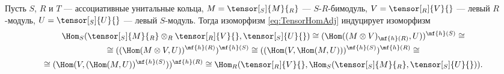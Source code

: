 \documentclass[
	extrafontsizes,
	11pt,
	hyphens,
]{memoir}
\begin{document}

\begin{observation}
Пусть \(S\), \(R\) и \(T\) --- ассоциативные унитальные кольца, \(M = \tensor[_S]{M}{_R}\) --- \(S\)-\(R\)-би\-мо\-дуль, \(V = \tensor[_R]{V}{}\) --- левый \(R\)-мо\-дуль, \(U = \tensor[_S]{U}{}\) --- левый \(S\)-мо\-дуль.
Тогда изоморфизм \eqref{eq:TensorHomAdj}
индуцирует изоморфизм
\begin{gather*}
\Hom_{S} (\tensor[_S]{M}{_R} \otimes_R \tensor[_R]{V}{}, \tensor[_S]{U}{})
\cong
(\Hom((M \otimes V)_{\mf{h}(R)}, U))^{\mf{h}(S)}
\cong
\\
\cong
((\Hom(M \otimes V, U))^{\mf{h}(R)})^{\mf{h}(S)}
\cong
((\Hom(V, \Hom(M, U)))^{\mf{h}(S)})^{\mf{h}(R)}
\cong
\\
\cong
(\Hom(V, (\Hom(M, U))^{\mf{h}(S)}))^{\mf{h}(R)}
\cong
\Hom_{R} (\tensor[_R]{V}{}, \Hom_{S} (\tensor[_S]{M}{_R}, \tensor[_S]{U}{})).
\end{gather*}
\end{observation}
\end{document}
